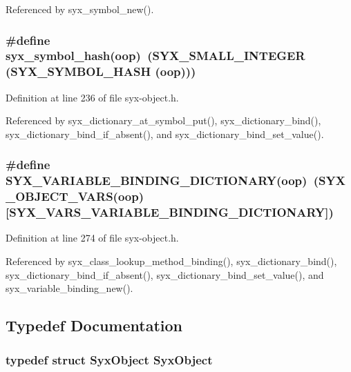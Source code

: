 Referenced by syx\_\-symbol\_\-new().\hypertarget{syx-object_8h_c3fb81a62dd8c0a741b3f78b0330f784}{
\subsubsection{\setlength{\rightskip}{0pt plus 5cm}\#define syx\_\-symbol\_\-hash(oop)~(SYX\_\-SMALL\_\-INTEGER (SYX\_\-SYMBOL\_\-HASH (oop)))}}
\label{syx-object_8h_c3fb81a62dd8c0a741b3f78b0330f784}




Definition at line 236 of file syx-object.h.

Referenced by syx\_\-dictionary\_\-at\_\-symbol\_\-put(), syx\_\-dictionary\_\-bind(), syx\_\-dictionary\_\-bind\_\-if\_\-absent(), and syx\_\-dictionary\_\-bind\_\-set\_\-value().\hypertarget{syx-object_8h_dda1b5610b8bfa9ae2eb8928fc3db518}{
\subsubsection{\setlength{\rightskip}{0pt plus 5cm}\#define SYX\_\-VARIABLE\_\-BINDING\_\-DICTIONARY(oop)~(SYX\_\-OBJECT\_\-VARS(oop)\mbox{[}SYX\_\-VARS\_\-VARIABLE\_\-BINDING\_\-DICTIONARY\mbox{]})}}
\label{syx-object_8h_dda1b5610b8bfa9ae2eb8928fc3db518}




Definition at line 274 of file syx-object.h.

Referenced by syx\_\-class\_\-lookup\_\-method\_\-binding(), syx\_\-dictionary\_\-bind(), syx\_\-dictionary\_\-bind\_\-if\_\-absent(), syx\_\-dictionary\_\-bind\_\-set\_\-value(), and syx\_\-variable\_\-binding\_\-new().

\subsection{Typedef Documentation}
\hypertarget{syx-object_8h_1bd7e679e4563ab6afb40a4ab1ccab7d}{
\subsubsection{\setlength{\rightskip}{0pt plus 5cm}typedef struct {\bf SyxObject} {\bf SyxObject}}}
\label{syx-object_8h_1bd7e679e4563ab6afb40a4ab1ccab7d}





